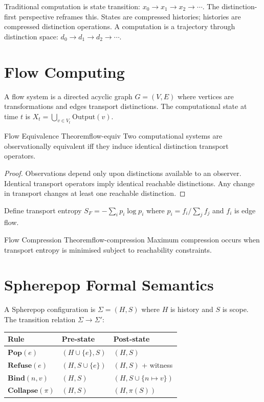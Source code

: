 \documentclass[12pt,twoside,openright]{book}
\begin{document}
Traditional computation is state transition:
$x_0 \to x_1 \to x_2 \to \cdots$.
The distinction-first perspective reframes this.
States are compressed histories; histories are compressed
distinction operations. A computation is a trajectory
through distinction space:
$d_0 \to d_1 \to d_2 \to \cdots$.

\section{Flow Computing}

A flow system is a directed acyclic graph $G = (V,E)$
where vertices are transformations and edges transport
distinctions.
The computational state at time $t$ is
$X_t = \bigcup_{v \in V_t}\mathrm{Output}(v)$.

\begin{theorem}{Flow Equivalence Theorem}{flow-equiv}
  Two computational systems are observationally equivalent
  iff they induce identical distinction transport operators.
\end{theorem}

\begin{proof}
  Observations depend only upon distinctions available
  to an observer. Identical transport operators imply
  identical reachable distinctions. Any change in
  transport changes at least one reachable distinction.
\end{proof}

Define transport entropy $S_F = -\sum_i p_i\log p_i$
where $p_i = f_i / \sum_j f_j$ and $f_i$ is edge flow.

\begin{theorem}{Flow Compression Theorem}{flow-compression}
  Maximum compression occurs when transport entropy is
  minimised subject to reachability constraints.
\end{theorem}

\section{Spherepop Formal Semantics}

A Spherepop configuration is $\Sigma = (H, S)$
where $H$ is history and $S$ is scope.
The transition relation $\Sigma \to \Sigma'$:

\medskip
\begin{center}
\begin{tabular}{lll}
\toprule
Rule & Pre-state & Post-state \\
\midrule
$\mathbf{Pop}(e)$      & $(H \cup \{e\}, S)$ & $(H, S)$ \\
$\mathbf{Refuse}(e)$   & $(H, S \cup \{e\})$ & $(H, S)$ + witness \\
$\mathbf{Bind}(n,v)$   & $(H, S)$ & $(H, S \cup \{n \mapsto v\})$ \\
$\mathbf{Collapse}(\pi)$ & $(H, S)$ & $(H, \pi(S))$ \\
\bottomrule
\end{tabular}
\end{center}
\end{document}
